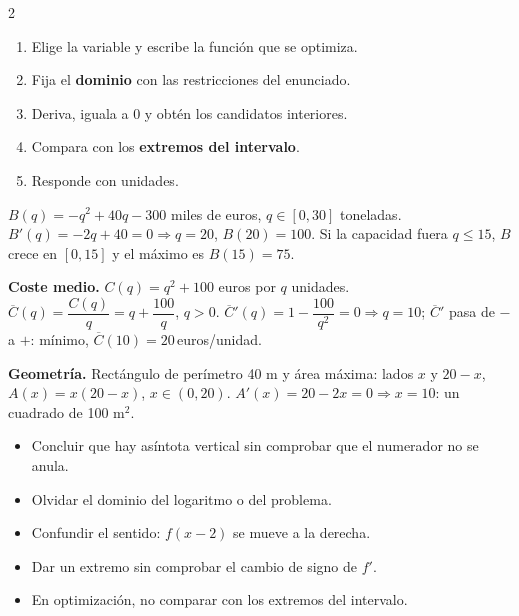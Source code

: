 \documentclass[10pt]{article}
\begin{document}
\begin{multicols}{2}
\begin{enumerate}
  \item Elige la variable y escribe la función que se optimiza.
  \item Fija el \textbf{dominio} con las restricciones del enunciado.
  \item Deriva, iguala a 0 y obtén los candidatos interiores.
  \item Compara con los \textbf{extremos del intervalo}.
  \item Responde con unidades.
\end{enumerate}
\begin{ejemplo}
\(B(q)=-q^2+40q-300\) miles de euros, \(q\in[0,30]\) toneladas. \(B'(q)=-2q+40=0\Rightarrow q=20\), \(B(20)=100\). Si la capacidad fuera \(q\le15\), \(B\) crece en \([0,15]\) y el máximo es \(B(15)=75\).
\end{ejemplo}
\begin{ejemplo}
\textbf{Coste medio.} \(C(q)=q^2+100\) euros por \(q\) unidades. \(\overline C(q)=\dfrac{C(q)}q=q+\dfrac{100}q\), \(q>0\).
\(\overline C'(q)=1-\dfrac{100}{q^2}=0\Rightarrow q=10\); \(\overline C'\) pasa de \(-\) a \(+\): mínimo, \(\overline C(10)=20\)\,euros/unidad.
\end{ejemplo}
\begin{ejemplo}
\textbf{Geometría.} Rectángulo de perímetro 40 m y área máxima: lados \(x\) y \(20-x\), \(A(x)=x(20-x)\), \(x\in(0,20)\). \(A'(x)=20-2x=0\Rightarrow x=10\): un cuadrado de 100 m\(^2\).
\end{ejemplo}

\begin{ojo}
\begin{itemize}
  \item Concluir que hay asíntota vertical sin comprobar que el numerador no se anula.
  \item Olvidar el dominio del logaritmo o del problema.
  \item Confundir el sentido: \(f(x-2)\) se mueve a la derecha.
  \item Dar un extremo sin comprobar el cambio de signo de \(f'\).
  \item En optimización, no comparar con los extremos del intervalo.
\end{itemize}
\end{ojo}

\end{multicols}
\end{document}
